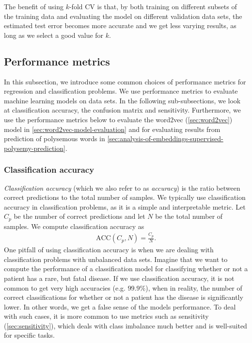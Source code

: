 The benefit of using $k$-fold CV is that, by both training on different subsets of the training data and evaluating the model on different validation data sets, the estimated test error becomes more accurate and we get less varying results, as long as we select a good value for $k$.

\subsection{Performance metrics}
\label{sec:performance-metrics}
In this subsection, we introduce some common choices of performance metrics for regression and classification problems. We use performance metrics to evaluate machine learning models on data sets. In the following sub-subsections, we look at classification accuracy, the confusion matrix and sensitivity. Furthermore, we use the performance metrics below to evaluate the word2vec (\cref{sec:word2vec}) model in \cref{sec:word2vec-model-evaluation} and for evaluating results from prediction of polysemous words in \cref{sec:analysis-of-embeddings-supervised-polysemy-prediction}.

\subsubsection{Classification accuracy}
\label{sec:classification-accuracy}
\textit{Classification accuracy} (which we also refer to as \textit{accuracy}) is the ratio between correct predictions to the total number of samples. We typically use classification accuracy in classification problems, as it is a simple and interpretable metric. Let $C_p$ be the number of correct predictions and let $N$ be the total number of samples. We compute classification accuracy as
\begin{align}
    \text{ACC}(C_p, N) = \frac{C_p}{N}.
    \label{eqn:classification-accuracy}
\end{align}
One pitfall of using classification accuracy is when we are dealing with classification problems with unbalanced data sets. Imagine that we want to compute the performance of a classification model for classifying whether or not a patient has a rare, but fatal disease. If we use classification accuracy, it is not common to get very high accuracies (e.g. $99.9\%$), when in reality, the number of correct classifications for whether or not a patient has the disease is significantly lower. In other words, we get a false sense of the models performance. To deal with such cases, it is more common to use metrics such as sensitivity (\cref{sec:sensitivity}), which deals with class imbalance much better and is well-suited for specific tasks.

